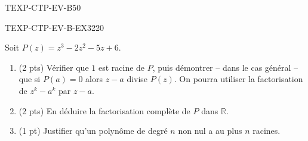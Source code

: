 \begin{evaluation}{TEXP-CTP-EV-B}{50}
\begin{exercice}{TEXP-CTP-EV-B-EX3}{2}{20}
\medskip

Soit $P(z)=z^3-2z^2-5z+6$.
\begin{enumerate}
  \item (2 pts) Vérifier que $1$ est racine de $P$, puis démontrer -- dans le cas général -- que si $P(a)=0$ alors $z-a$ divise $P(z)$. On pourra utiliser la factorisation de $z^k-a^k$ par $z-a$.
  \item (2 pts) En déduire la factorisation complète de $P$ dans $\mathbb{R}$.
  \item (1 pt) Justifier qu'un polynôme de degré $n$ non nul a au plus $n$ racines.
\end{enumerate}
\end{exercice}

\end{evaluation}
